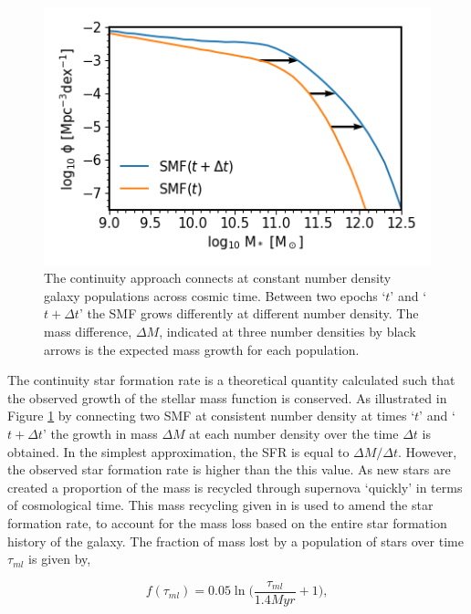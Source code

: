 \begin{figure}[h]
    \centering
    \includegraphics[width = \linewidth]{Figures/Chapter2/ContinuityEqn.png}
    \caption{The continuity approach connects at constant number density galaxy populations across cosmic time. Between two epochs `$t$' and `$t + \Delta t$' the SMF grows differently at different number density. The mass difference, $\Delta M$, indicated at three number densities by black arrows is the expected mass growth for each population.}
    \label{fig:Cont_Eqn}
\end{figure}

The continuity star formation rate is a theoretical quantity calculated such that the observed growth of the stellar mass function is conserved. As illustrated in Figure \ref{fig:Cont_Eqn} by connecting two SMF at consistent number density at times `$t$' and `$t + \Delta t$' the growth in mass $\Delta M$ at each number density over the time $\Delta t$ is obtained. In the simplest approximation, the SFR is equal to $\Delta M / \Delta t$. However, the observed star formation rate is higher than the this value. As new stars are created a proportion of the mass is recycled through supernova `quickly' in terms of cosmological time. This mass recycling given in \citet{Moster2018Emerge10} is used to amend the star formation rate, to account for the mass loss based on the entire star formation history of the galaxy. The fraction of mass lost by a population of stars over time $\tau_{ml}$ is given by,

\begin{equation}
\label{eqn:f_ml}
f(\tau_{ml}) = 0.05 \ln \Big(\frac{\tau_{ml}}{1.4 Myr}+1\Big),
\end{equation}

